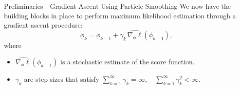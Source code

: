 \documentclass[10pt, aspectratio=1610]{beamer}
\newcommand{\given}{\,|\,}
\begin{document}

    \begin{frame}{Preliminaries - Gradient Ascent Using Particle Smoothing}
        We now have the building blocks in place to perform maximum likelihood estimation through a gradient ascent procedure:
        \begin{equation}
            \phi_k = \phi_{k-1} + \gamma_k \, \widehat{\nabla_\phi \ell}(\phi_{k-1}),
        \end{equation}
        where
        \begin{itemize}
          \item<2-> $\widehat{\nabla_\phi \ell}(\phi_{k-1})$ is a stochastic estimate of the score function.
          \item<3-> $\gamma_k$ are step sizes that satisfy $\sum_{k=1}^\infty \gamma_k = \infty, \quad \sum_{k=1}^\infty \gamma_k^2 < \infty$.
        \end{itemize}
    \end{frame}
\end{document}
